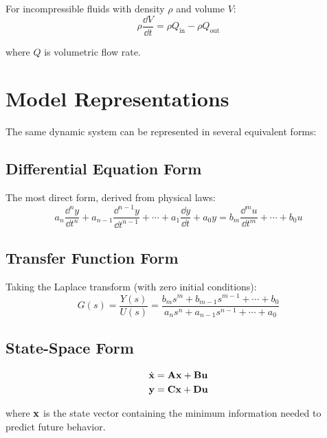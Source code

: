 For incompressible fluids with density $\rho$ and volume $V$:
\begin{equation}
\rho\frac{\dd V}{\dd t} = \rho Q_{\text{in}} - \rho Q_{\text{out}}
\end{equation}

where $Q$ is volumetric flow rate.

\chapter{Model Representations}
\label{ch:model_representations}

The same dynamic system can be represented in several equivalent forms:

\section{Differential Equation Form}

The most direct form, derived from physical laws:
\begin{equation}
a_n\frac{\dd^n y}{\dd t^n} + a_{n-1}\frac{\dd^{n-1} y}{\dd t^{n-1}} + \cdots + a_1\frac{\dd y}{\dd t} + a_0 y = b_m\frac{\dd^m u}{\dd t^m} + \cdots + b_0 u
\end{equation}

\section{Transfer Function Form}

Taking the Laplace transform (with zero initial conditions):
\begin{equation}
G(s) = \frac{Y(s)}{U(s)} = \frac{b_m s^m + b_{m-1}s^{m-1} + \cdots + b_0}{a_n s^n + a_{n-1}s^{n-1} + \cdots + a_0}
\end{equation}

\section{State-Space Form}

\begin{align}
\dot{\mathbf{x}} &= \mathbf{A}\mathbf{x} + \mathbf{B}\mathbf{u} \\
\mathbf{y} &= \mathbf{C}\mathbf{x} + \mathbf{D}\mathbf{u}
\end{align}

where $\mathbf{x}$ is the state vector containing the minimum information needed to predict future behavior.

